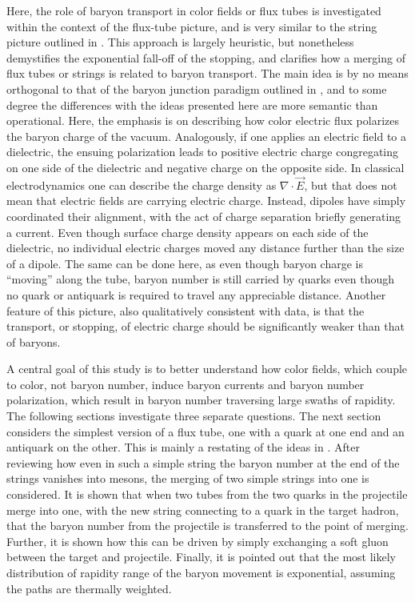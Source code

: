 \documentclass[aps, prc, 12pt, nofootinbib, showpacs, superscriptaddress, tightenlines, groupedaddress]{revtex4-2}
\begin{document}
Here, the role of baryon transport in color fields or flux tubes is investigated within the context of the flux-tube picture, and is very similar to the string picture outlined in \cite{Vance:1997th}. This approach is largely heuristic, but nonetheless demystifies the exponential fall-off of the stopping, and clarifies how a merging of flux tubes or strings is related to baryon transport. The main idea is by no means orthogonal to that of the baryon junction paradigm outlined in \cite{Kharzeev:1996sq}, and to some degree the differences with the ideas presented here are more semantic than operational. Here, the emphasis is on describing how color electric flux polarizes the baryon charge of the vacuum. Analogously, if one applies an electric field to a dielectric, the ensuing polarization leads to positive electric charge congregating on one side of the dielectric and negative charge on the opposite side. In classical electrodynamics one can describe the charge density as $\nabla\cdot\vec{E}$, but that does not mean that electric fields are carrying electric charge. Instead, dipoles have simply coordinated their alignment, with the act of charge separation briefly generating a current. Even though surface charge density appears on each side of the dielectric, no individual electric charges moved any distance further than the size of a dipole. The same can be done here, as even though baryon charge is ``moving'' along the tube, baryon number is still carried by quarks even though no quark or antiquark is required to travel any appreciable distance. Another feature of this picture, also qualitatively consistent with data, is that the transport, or stopping, of electric charge should be significantly weaker than that of baryons.

A central goal of this study is to better understand how color fields, which couple to color, not baryon number, induce baryon currents and baryon number polarization, which result in baryon number traversing large swaths of rapidity. The following sections investigate three separate questions. The next section considers the simplest version of a flux tube, one with a quark at one end and an antiquark on the other. This is mainly a restating of the ideas in \cite{Vance:1997th}. After reviewing how even in such a simple string the baryon number at the end of the strings vanishes into mesons, the merging of two simple strings into one is considered. It is shown that when two tubes from the two quarks in the projectile merge into one, with the new string connecting to a quark in the target hadron, that the baryon number from the projectile is transferred to the point of merging. Further, it is shown how this can be driven by simply exchanging a soft gluon between the target and projectile. Finally, it is pointed out that the most likely distribution of rapidity range of the baryon movement is exponential, assuming the paths are thermally weighted.
\end{document}
